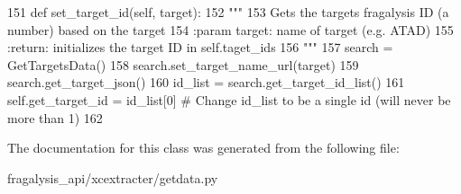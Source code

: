 \begin{DoxyCode}
151     \textcolor{keyword}{def }set\_target\_id(self, target):
152         \textcolor{stringliteral}{"""}
153 \textcolor{stringliteral}{        Gets the targets fragalysis ID (a number) based on the target}
154 \textcolor{stringliteral}{        :param target: name of target (e.g. ATAD)}
155 \textcolor{stringliteral}{        :return: initializes the target ID in self.taget\_ids}
156 \textcolor{stringliteral}{        """}
157         search = GetTargetsData()
158         search.set\_target\_name\_url(target)
159         search.get\_target\_json()
160         id\_list = search.get\_target\_id\_list()
161         self.get\_target\_id = id\_list[0]  \textcolor{comment}{# Change id\_list to be a single id (will never be more than 1)}
162 
\end{DoxyCode}


The documentation for this class was generated from the following file\+:\begin{DoxyCompactItemize}
\item 
fragalysis\+\_\+api/xcextracter/getdata.\+py\end{DoxyCompactItemize}
